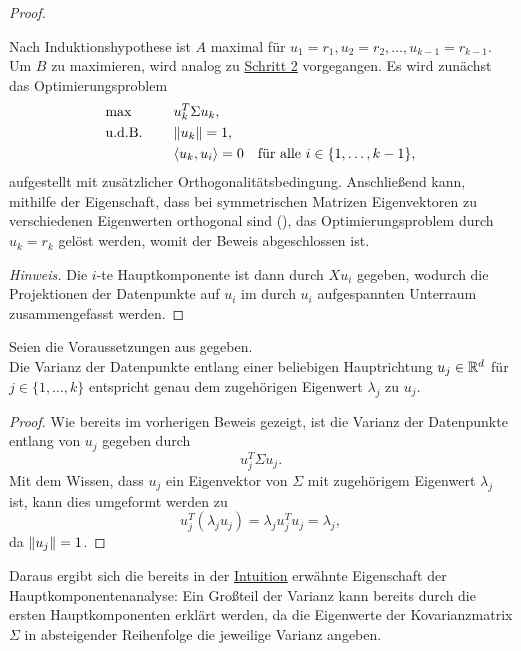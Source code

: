 \begin{proof}
\begin{enumerate}[wide,label=\underline{Schritt \arabic*}.]
\begin{equation*}
    \end{equation*}
    Nach Induktionshypothese ist \(A\) maximal für \(u_{1}=r_{1},u_{2}=r_{2},\ldots,u_{k-1}=r_{k-1}\). 
    Um \(B\) zu maximieren, wird analog zu \hyperref[itm:pca2]{Schritt 2} vorgegangen.
    Es wird zunächst das Optimierungsproblem
    \begin{alignat*}{2}
        &\!\max \qquad &&u_{k}^{T} \Sigma u_{k}, \\
        &\text{u.d.B.}  &&\lVert u_{k}\rVert=1, \\   
        &&& \langle u_{k},u_{i} \rangle = 0 \quad \text{für alle } i \in \{1,\ldots,k-1\},    
    \end{alignat*}
    aufgestellt mit zusätzlicher Orthogonalitätsbedingung.
    Anschließend kann, mithilfe der Eigenschaft, dass bei symmetrischen Matrizen Eigenvektoren zu verschiedenen Eigenwerten orthogonal sind (), das Optimierungsproblem durch \(u_{k} = r_{k}\) gelöst werden, womit der Beweis abgeschlossen ist.
\end{enumerate}
\emph{Hinweis.} Die \(i\)-te Hauptkomponente ist dann durch \(Xu_{i}\) gegeben, wodurch die Projektionen der Datenpunkte auf \(u_{i}\) im durch \(u_{i}\) aufgespannten Unterraum zusammengefasst werden.    
\end{proof}
\begin{corollary}
    Seien die Voraussetzungen aus  gegeben. \\
    Die Varianz der Datenpunkte entlang einer beliebigen Hauptrichtung \(u_{j} \in \mathbb{R}^{d}\) für \(j \in \{1,\ldots,k\}\) entspricht genau dem zugehörigen Eigenwert \(\lambda_{j}\)  zu \(u_{j}\).    
\end{corollary}
\begin{proof}
    Wie bereits im vorherigen Beweis gezeigt, ist die Varianz der Datenpunkte entlang von \(u_{j}\) gegeben durch
    \begin{equation*}
        u_{j}^{T}\Sigma u_{j}.
    \end{equation*}
    Mit dem Wissen, dass \(u_{j}\) ein Eigenvektor von \(\Sigma\) mit zugehörigem Eigenwert \(\lambda_{j}\) ist, kann dies umgeformt werden zu
    \begin{equation*}
        u_{j}^{T}(\lambda_{j}u_{j}) = \lambda_{j}u_{j}^{T}u_{j} = \lambda_{j},
    \end{equation*}   
    da \(\lVert u_{j}\rVert=1\). 
\end{proof}
\begin{remark}
    Daraus ergibt sich die bereits in der \hyperref[sec:pcaint]{Intuition} erwähnte Eigenschaft der Hauptkomponentenanalyse:
    Ein Großteil der Varianz kann bereits durch die ersten Hauptkomponenten erklärt werden, da die Eigenwerte der Kovarianzmatrix \(\Sigma\) in absteigender Reihenfolge die jeweilige Varianz angeben.
\end{remark}

